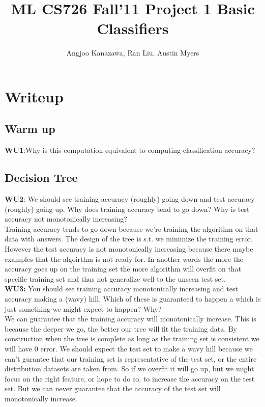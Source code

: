 \documentclass[a4paper,11pt]{article}
\begin{document}
\title{ML CS726 Fall'11 Project 1 Basic Classifiers}
\author{Angjoo Kanazawa, Ran Liu, Austin Myers}
\maketitle


\section{Writeup}
\subsection{Warm up}
\textbf{WU1}:\textsf{Why is this computation equivalent to computing classification
accuracy?}\\
\subsection{Decision Tree}
\textbf{WU2}:\textsf{ We should see training accuracy (roughly) going down and
test accuracy (roughly) going up.  Why does training accuracy tend to
go down?  Why is test accuracy not monotonically
increasing?}\\

Training accuracy tends to go down because we're training the
algorithm on that data with answers. The design of the tree is s.t. we
minimize the training error. However the test accuracy is not
monotonically increasing because there maybe examples that the
algoirthm is not ready for. In another words the more the accuracy
goes up on the training set the more algorithm will overfit on that
specific training set and thus not generalize well to the unseen test set.\\

\noindent
\textbf{WU3:} \textsf{You should see training accuracy monotonically increasing
and test accuracy making a (wavy) hill.  Which of these
is guaranteed to happen a which is just something we might
expect to happen?  Why?}\\

We can guarantee that the training accuracy will monotonically
increase. This is because the deeper we go, the better our tree will
fit the training data. By construction when the tree is complete as
long as the training set is consistent we will have 0 error. We should
expect the test set to make a wavy hill because we can't gurantee that
our training set is representative of the test set, or the entire
distribution datasets are taken from. So if we overfit it will go up,
but we might focus on the right feature, or hope to do so, to increase
the accuracy on the test set. But we can never guarantee that the
accuracy of the test set will monotonically increase.\\
\end{document}
